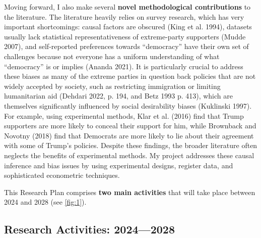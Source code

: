 \documentclass[letterpaper]{article}
\begin{document}
\vspace{2mm}Moving forward, I also make several {\bf novel methodological contributions} to the literature. The literature heavily relies on survey research, which has very important shortcomings: causal factors are obscured (King et al. 1994), datasets usually lack statistical representativeness of extreme-party supporters (Mudde 2007), and self-reported preferences towards ``democracy'' have their own set of challenges because not everyone has a uniform understanding of what ``democracy'' is or implies (Ananda 2021). It is particularly crucial to address these biases as many of the extreme parties in question back policies that are not widely accepted by society, such as restricting immigration or limiting humanitarian aid (Dehdari 2022, p. 194, and Betz 1993 p. 413), which are themselves significantly influenced by social desirability biases (Kuklinski 1997). For example, using experimental methods, Klar et al. (2016) find that Trump supporters are more likely to conceal their support for him, while Brownback and Novotny (2018) find that Democrats are more likely to lie about their agreement with some of Trump's policies. Despite these findings, the broader literature often neglects the benefits of experimental methods. My project addresses these causal inference and bias issues by using experimental designs, register data, and sophisticated econometric techniques. 

{\color{red}This Research Plan comprises {\bf two main activities} that will take place between 2024 and 2028} (see \autoref{fig:1}).

\subsection*{Research Activities: 2024---2028}
\end{document}
